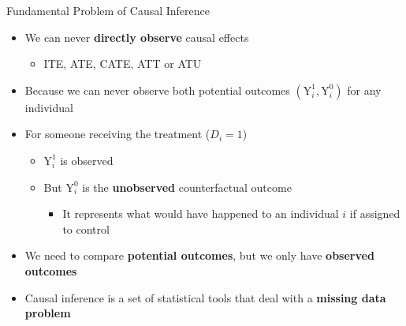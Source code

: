 \documentclass[hyperref={pdfpagelabels=false}]{beamer}
\begin{document}
\begin{frame}{Fundamental Problem of Causal Inference}
\begin{itemize}

\item We can never \textbf{directly observe} causal effects 
\vspace{0.2cm}
\begin{itemize}
\item ITE, ATE, CATE, ATT or ATU
\end{itemize}

\vspace{0.2cm}
\item Because we can never observe both potential outcomes $(\mathrm{Y}^{1}_{i},\mathrm{Y}^{0}_{i})$ for any individual
\vspace{0.2cm}
\item For someone receiving the treatment ($D_i = 1$)
\vspace{0.2cm}
\begin{itemize}
\item $\mathrm{Y}^{1}_{i}$ is observed 
\vspace{0.2cm}
\item But $\mathrm{Y}^{0}_{i}$ is the \textbf{unobserved} counterfactual outcome
\vspace{0.2cm}
\begin{itemize}
\item It represents what would have happened to an individual $i$ if assigned to control
\end{itemize}
\end{itemize}
\vspace{0.2cm}
\item We need to compare \textbf{potential outcomes}, but we only have
\textbf{observed outcomes}
\vspace{0.2cm}
\item Causal inference is a set of statistical tools that deal with a \textbf{missing data problem}



\end{itemize}

\end{frame}
\end{document}
